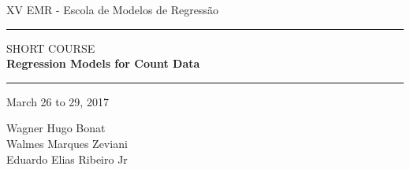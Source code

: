 \documentclass[11pt, a5paper]{book}
\begin{document}
\begin{titlepage}
\thispagestyle{empty}
\centering

\vspace*{\fill}

XV EMR - Escola de Modelos de Regressão
\vspace{0.5cm}

\noindent\rule{\textwidth}{0.4mm}
\vspace*{-0.2cm}

SHORT COURSE\\[0.2cm]

\textbf{Regression Models for Count Data}\\

\noindent\rule{\textwidth}{0.4mm}
\vspace{0.5cm}

March 26 to 29, 2017
\vspace{1.5cm}

Wagner Hugo Bonat\\
Walmes Marques Zeviani\\
Eduardo Elias Ribeiro Jr

\vspace*{\fill}
\end{titlepage}

\thispagestyle{empty}
\cleardoublepage
\end{document}
